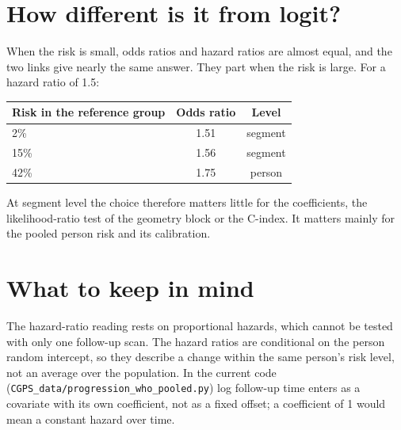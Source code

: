 \documentclass[11pt]{article}
\begin{document}
\section*{How different is it from logit?}

When the risk is small, odds ratios and hazard ratios are almost equal, and
the two links give nearly the same answer. They part when the risk is large.
For a hazard ratio of 1.5:

\begin{center}
\begin{tabular}{lcc}
\toprule
Risk in the reference group & Odds ratio & Level \\
\midrule
2\%  & 1.51 & segment \\
15\% & 1.56 & segment \\
42\% & 1.75 & person \\
\bottomrule
\end{tabular}
\end{center}

At segment level the choice therefore matters little for the coefficients,
the likelihood-ratio test of the geometry block or the C-index. It matters
mainly for the pooled person risk and its calibration.

\section*{What to keep in mind}

The hazard-ratio reading rests on proportional hazards, which cannot be
tested with only one follow-up scan. The hazard ratios are conditional on the
person random intercept, so they describe a change within the same person's
risk level, not an average over the population. In the current code
(\texttt{CGPS\_data/progression\_who\_pooled.py}) log follow-up time enters
as a covariate with its own coefficient, not as a fixed offset; a coefficient
of 1 would mean a constant hazard over time.
\end{document}
